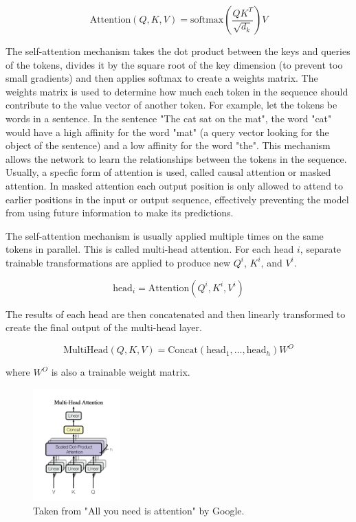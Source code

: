 \documentclass[11pt]{article}
\begin{document}
$$\text{Attention}(Q, K , V) = \text{softmax}\left(\frac{QK^T}{\sqrt{d_k}}\right)V$$

The self-attention mechanism takes the dot product between the keys and queries of the tokens, divides it by the square root of the key dimension (to prevent too small gradients) and then applies softmax to create a weights matrix. The weights matrix is used to determine how much each token in the sequence should contribute to the value vector of another token. For example, let the tokens be words in a sentence. In the sentence "The cat sat on the mat", the word "cat" would have a high affinity for the word "mat" (a query vector looking for the object of the sentence) and a low affinity for the word "the". This mechanism allows the network to learn the relationships between the tokens in the sequence. Usually, a specfic form of attention is used, called causal attention or masked attention. In masked attention each output position is only allowed to attend to earlier positions in the input or output sequence, effectively preventing the model from using future information to make its predictions.

The self-attention mechanism is usually applied multiple times on the same tokens in parallel. This is called multi-head attention. For each head $i$, separate trainable transformations are applied to produce new $Q^i$, $K^i$, and $V^i$.

$$\text{head}_i = \text{Attention}(Q^i, K^i, V^i)$$

The results of each head are then concatenated and then linearly transformed to create the final output of the multi-head layer.

$$\text{MultiHead}(Q, K, V) = \text{Concat}(\text{head}_1, \ldots, \text{head}_h)W^O$$

where $W^O$ is also a trainable weight matrix.

\begin{figure}[h]
\centering
\includegraphics[width=0.3\textwidth]{multi-head.png}
\caption{Taken from "All you need is attention" by Google.}
\end{figure}
\end{document}
